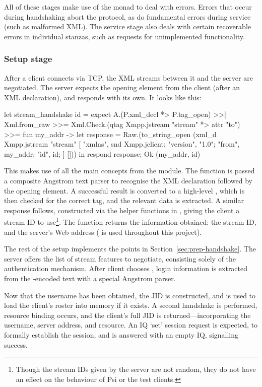 All of these stages make use of the  monad to deal with errors. Errors that occur during handshaking abort the protocol, as do fundamental errors during service (such as malformed XML). The service stage also deals with certain recoverable errors in individual stanzas, such as requests for unimplemented functionality.

\subsubsection{Setup stage}\label{sec:server-setup}
After a client connects via TCP, the XML streams between it and the server are negotiated. The server expects the  opening element from the client (after an XML declaration), and responds with its own. It looks like this:

\begin{ocaml}
let stream_handshake id =
  expect A.(P.xml_decl *> P.tag_open) >>| Xml.from_raw >>=
    Xml.Check.(qtag Xmpp.jstream "stream" *> attr "to") >>= fun my_addr ->
  let response = Raw.(to_string_open (xml_d Xmpp.jstream "stream" [
    "xmlns", snd Xmpp.jclient;
    "version", "1.0"; "from", my_addr; "id", id;
  ] []))
  in respond response; Ok (my_addr, id)
\end{ocaml}

This makes use of all the main concepts from the  module. The  function is passed a composite Angstrom text parser to recognise the XML declaration followed by the opening  element. A successful result is converted to a high-level , which is then checked for the correct tag, and the relevant data is extracted. A similar response follows, constructed via the helper functions in , giving the client a stream ID to use\footnote{Though the stream IDs given by the server are not random, they do not have an effect on the behaviour of Psi or the test clients.}. The function returns the information obtained: the stream ID, and the server's Web address ( is used throughout this project).

The rest of the setup implements the points in Section~\ref{sec:prep-handshake}. The server offers the list of stream features to negotiate, consisting solely of the  authentication mechanism. After client chooses , login information is extracted from the -encoded text with a special Angstrom parser.

Now that the username has been obtained, the JID is constructed, and is used to load the client's roster into memory if it exists. A second handshake is performed, resource binding occurs, and the client's full JID is returned---incorporating the username, server address, and resource. An IQ `set' session request is expected, to formally establish the session, and is answered with an empty IQ, signalling success.

